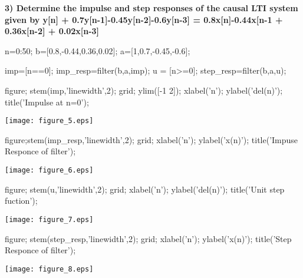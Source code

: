 \documentclass[12pt, onecolumn]{IEEEtran}
\begin{document}
\begin{par}
	\begin{flushleft}
		\textbf{3) Determine the impulse and step responses of the causal LTI system given by y[n] + 0.7y[n-1]-0.45y[n-2]-0.6y[n-3] = 0.8x[n]-0.44x[n-1 + 0.36x[n-2] + 0.02x[n-3]}
	\end{flushleft}
\end{par}

\begin{matlabcode}
	n=0:50; %
	b=[0.8,-0.44,0.36,0.02]; %
	a=[1,0.7,-0.45,-0.6]; %
	
	imp=[n==0]; %
	imp_resp=filter(b,a,imp); %
	u = [n>=0]; %
	step_resp=filter(b,a,u); %
	
	figure; stem(imp,'linewidth',2); grid; ylim([-1 2]); %
	xlabel('n'); ylabel('del(n)'); title('Impulse at n=0'); 
\end{matlabcode}
\begin{center}
	\texttt{[image: figure\_5.eps]}
\end{center}
\begin{matlabcode}
	
	figure;stem(imp_resp,'linewidth',2); grid; %
	xlabel('n'); ylabel('x(n)'); title('Impuse Responce of filter');
\end{matlabcode}
\begin{center}
	\texttt{[image: figure\_6.eps]}
\end{center}
\begin{matlabcode}
	
	figure; stem(u,'linewidth',2); grid; %
	xlabel('n'); ylabel('del(n)'); title('Unit step fuction');
\end{matlabcode}
\begin{center}
	\texttt{[image: figure\_7.eps]}
\end{center}
\begin{matlabcode}
	
	figure; stem(step_resp,'linewidth',2); grid; %
	xlabel('n'); ylabel('x(n)'); title('Step Responce of filter');
\end{matlabcode}
\begin{center}
	\texttt{[image: figure\_8.eps]}
\end{center}
\end{document}
